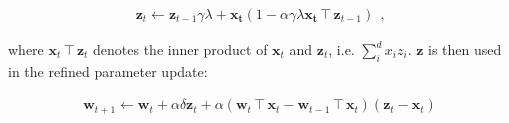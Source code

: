 \begin{gather}
\boldsymbol{z}_{t} \leftarrow \boldsymbol{z}_{t-1} \gamma \lambda + \boldsymbol{x_t} (1 - \alpha \gamma \lambda  {  \boldsymbol{x_t} \intercal \boldsymbol{z}_{t-1} }) ~~ \text{,}
\end{gather}

where $ \boldsymbol{x}_t \intercal \boldsymbol{z}_t $ denotes the inner product of $\boldsymbol{x}_t$ and $\boldsymbol{z}_t$, i.e. $\sum_{i}^{d} x_i z_i$. $\boldsymbol{z}$ is then used in the refined parameter update:

\begin{gather}
	\boldsymbol{w}_{t+1} \leftarrow
		\boldsymbol{w}_{t} +
		\alpha \delta \boldsymbol{z}_t +
		\alpha ( \boldsymbol{w}_t \intercal \boldsymbol{x}_t  -
				 \boldsymbol{w}_{t-1} \intercal \boldsymbol{x}_t)
				(\boldsymbol{z}_t - \boldsymbol{x}_t)
\end{gather}